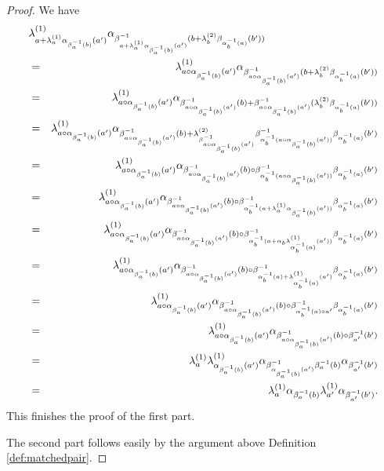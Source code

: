 \begin{proof}
We have
\begin{eqnarray*}
	\lefteqn{\lambda^{(1)}_{a+\lambda^{(1)}_{a}\alpha_{\beta^{-1}_{a}(b)}(a')}\alpha_{\beta^{-1}_{a+\lambda^{(1)}_{a}\alpha_{\beta^{-1}_{a}(b)}(a')}(b+\lambda^{(2)}_{b}\beta_{\alpha^{-1}_{b}(a)}(b'))}}\\
	&=& \lambda^{(1)}_{a\circ \alpha_{\beta^{-1}_{a}(b)}(a')}\alpha_{\beta^{-1}_{a\circ \alpha_{\beta^{-1}_{a}(b)}(a')}(b+\lambda^{(2)}_{b}\beta_{\alpha^{-1}_{b}(a)}(b'))}\\
	&=& \lambda^{(1)}_{a\circ \alpha_{\beta^{-1}_{a}(b)}(a')}\alpha_{\beta^{-1}_{a\circ \alpha_{\beta^{-1}_{a}(b)}(a')}(b)+\beta^{-1}_{a\circ \alpha_{\beta^{-1}_{a}(b)}(a')}(\lambda^{(2)}_{b}\beta_{\alpha^{-1}_{b}(a)}(b'))}\\
	&=& \lambda^{(1)}_{a\circ \alpha_{\beta^{-1}_{a}(b)}(a')}\alpha_{\beta^{-1}_{a\circ \alpha_{\beta^{-1}_{a}(b)}(a')}(b)+\lambda^{(2)}_{\beta^{-1}_{a\circ \alpha_{\beta^{-1}_{a}(b)}(a')}}\beta^{-1}_{\alpha^{-1}_b(a\circ \alpha_{\beta^{-1}_a(b)}(a'))}\beta_{\alpha^{-1}_{b}(a)}(b')}\\
	&=& \lambda^{(1)}_{a\circ \alpha_{\beta^{-1}_{a}(b)}(a')}\alpha_{\beta^{-1}_{a\circ \alpha_{\beta^{-1}_{a}(b)}(a')}(b)\circ \beta^{-1}_{\alpha^{-1}_b(a\circ \alpha_{\beta^{-1}_a(b)}(a'))}\beta_{\alpha^{-1}_{b}(a)}(b')}\\
	&=& \lambda^{(1)}_{a\circ \alpha_{\beta^{-1}_{a}(b)}(a')}\alpha_{\beta^{-1}_{a\circ \alpha_{\beta^{-1}_{a}(b)}(a')}(b)\circ \beta^{-1}_{\alpha^{-1}_b(a+\lambda^{(1)}_a\alpha_{\beta^{-1}_a(b)}(a'))}\beta_{\alpha^{-1}_{b}(a)}(b')}\\
	&=& \lambda^{(1)}_{a\circ \alpha_{\beta^{-1}_{a}(b)}(a')}\alpha_{\beta^{-1}_{a\circ \alpha_{\beta^{-1}_{a}(b)}(a')}(b)\circ \beta^{-1}_{\alpha^{-1}_b(a+\alpha_b\lambda^{(1)}_{\alpha^{-1}_b(a)}(a'))}\beta_{\alpha^{-1}_{b}(a)}(b')}\\
	&=& \lambda^{(1)}_{a\circ \alpha_{\beta^{-1}_{a}(b)}(a')}\alpha_{\beta^{-1}_{a\circ \alpha_{\beta^{-1}_{a}(b)}(a')}(b)\circ \beta^{-1}_{\alpha^{-1}_b(a)+\lambda^{(1)}_{\alpha^{-1}_b(a)}(a')}\beta_{\alpha^{-1}_{b}(a)}(b')}\\
	&=& \lambda^{(1)}_{a\circ \alpha_{\beta^{-1}_{a}(b)}(a')}\alpha_{\beta^{-1}_{a\circ \alpha_{\beta^{-1}_{a}(b)}(a')}(b)\circ \beta^{-1}_{\alpha^{-1}_b(a)\circ a'}\beta_{\alpha^{-1}_{b}(a)}(b')}\\
	&=& \lambda^{(1)}_{a\circ \alpha_{\beta^{-1}_{a}(b)}(a')}\alpha_{\beta^{-1}_{a\circ \alpha_{\beta^{-1}_{a}(b)}(a')}(b)\circ \beta^{-1}_{a'}(b')}\\
	&=& \lambda^{(1)}_{a}\lambda^{(1)}_{\alpha_{\beta^{-1}_{a}(b)}(a')}\alpha_{\beta^{-1}_{\alpha_{\beta^{-1}_{a}(b)}(a')}\beta^{-1}_a(b)}\alpha_{\beta^{-1}_{a'}(b')}\\
	&=& \lambda^{(1)}_{a}\alpha_{\beta^{-1}_a(b)}\lambda^{(1)}_{a'}\alpha_{\beta^{-1}_{a'}(b')}.
\end{eqnarray*}
This finishes the proof of the first part.

The second part follows easily by the argument above Definition \ref{def:matchedpair}.
\end{proof}
